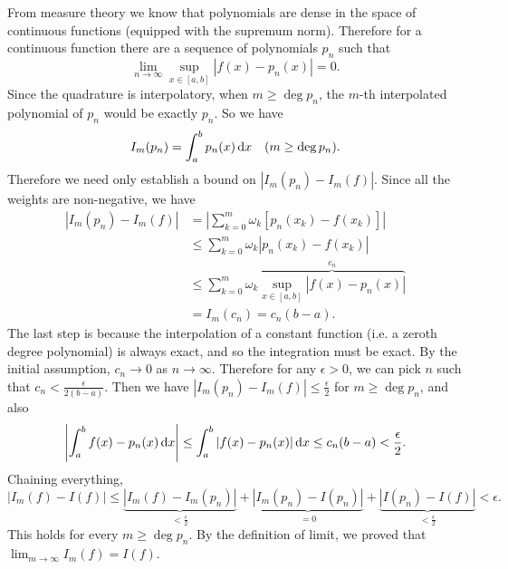 \documentclass{homework}
\begin{document}
\begin{problem}
From measure theory we know that polynomials are dense in the space of continuous functions (equipped with the supremum norm). Therefore for a continuous function there are a sequence of polynomials \(p_n\) such that
\[\lim_{n\to\infty} \sup_{x \in [a,b]} |f(x) - p_n(x)| = 0.\]
Since the quadrature is interpolatory, when \(m \ge \deg p_n\), the \(m\)-th interpolated polynomial of \(p_n\) would be exactly \(p_n\). So we have \[I_m(p_n) = \int_a^b p_n(x) \d[x] \quad (m \ge \deg p_n).\] Therefore we need only establish a bound on \(|I_m(p_n) - I_m(f)|\). Since all the weights are non-negative, we have
\begin{align*}
|I_m(p_n) - I_m(f)|
&= \left| \sum_{k=0}^m \omega_k [p_n(x_k) - f(x_k)] \right|\\
&\le \sum_{k=0}^m \omega_k |p_n(x_k) - f(x_k)|\\
&\le \sum_{k=0}^m \omega_k \overbrace{\sup_{x \in [a,b]} |f(x) - p_n(x)|}^{c_n}\\
&=I_m(c_n) = c_n(b-a).
\end{align*}
The last step is because the interpolation of a constant function (i.e. a zeroth degree polynomial) is always exact, and so the integration must be exact. By the initial assumption, \(c_n \to 0\) as \(n \to \infty\). Therefore for any \(\epsilon > 0\), we can pick \(n\) such that \(c_n < \frac\epsilon{2(b-a)}\). Then we have \(|I_m(p_n) - I_m(f)| \le \frac\epsilon 2\) for \(m \ge \deg p_n\), and also
\[\left|\int_{a}^b f(x) - p_n(x) \d[x]\right|
\le \int_a^b |f(x) - p_n(x)| \d[x]
\le c_n(b-a) < \frac\epsilon{2}.\]
Chaining everything,
\[\left|I_m(f) - I(f) \right|
\le \underbrace{|I_m(f) - I_m(p_n)|}_{< \frac\epsilon2} + \underbrace{|I_m(p_n) - I(p_n)|}_{=0} + \underbrace{|I(p_n) - I(f)|}_{<\frac\epsilon2} < \epsilon.\]
This holds for every \(m \ge \deg p_n\). By the definition of limit, we proved that \(\lim_{m\to\infty}I_m(f) = I(f)\).
\end{problem}
\end{document}
